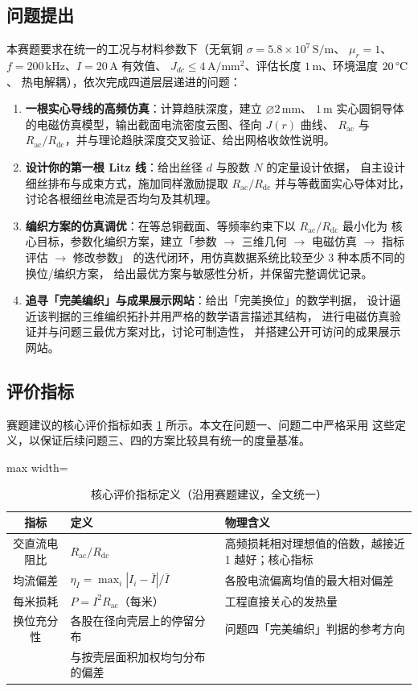 \documentclass[12pt, a4paper]{ctexart}
\newcommand{\Rac}{R_{\mathrm{ac}}}
\newcommand{\Rdc}{R_{\mathrm{dc}}}
\newcommand{\U}[1]{\ensuremath{\,\mathrm{#1}}}
\newcommand{\UdegC}{\ensuremath{\,\text{\textdegree}\mathrm{C}}}%
\begin{document}
\subsection{问题提出}

本赛题要求在统一的工况与材料参数下（无氧铜 $\sigma = 5.8\times10^{7}\U{S/m}$、
$\mu_r = 1$、$f = 200\U{kHz}$、$I = 20\U{A}$ 有效值、
$J_{dc}\le 4\U{A/mm^2}$、评估长度 $1\U{m}$、环境温度 $20\UdegC$、
热电解耦），依次完成四道层层递进的问题：

\begin{enumerate}[label=\textbf{问题\arabic*}, leftmargin=4.2em, itemsep=3pt]
\item \textbf{一根实心导线的高频仿真}：计算趋肤深度，建立 $\varnothing 2\U{mm}$、
$1\U{m}$ 实心圆铜导体的电磁仿真模型，输出截面电流密度云图、径向 $J(r)$ 曲线、
$\Rac$ 与 $\Rac/\Rdc$，并与理论趋肤深度交叉验证、给出网格收敛性说明。
\item \textbf{设计你的第一根 Litz 线}：给出丝径 $d$ 与股数 $N$ 的定量设计依据，
自主设计细丝排布与成束方式，施加同样激励提取 $\Rac/\Rdc$ 并与等截面实心导体对比，
讨论各根细丝电流是否均匀及其机理。
\item \textbf{编织方案的仿真调优}：在等总铜截面、等频率约束下以 $\Rac/\Rdc$ 最小化为
核心目标，参数化编织方案，建立「参数 $\to$ 三维几何 $\to$ 电磁仿真 $\to$ 指标评估 $\to$ 修改参数」
的迭代闭环，用仿真数据系统比较至少 3 种本质不同的换位/编织方案，
给出最优方案与敏感性分析，并保留完整调优记录。
\item \textbf{追寻「完美编织」与成果展示网站}：给出「完美换位」的数学判据，
设计逼近该判据的三维编织拓扑并用严格的数学语言描述其结构，
进行电磁仿真验证并与问题三最优方案对比，讨论可制造性，
并搭建公开可访问的成果展示网站。
\end{enumerate}

\subsection{评价指标}

赛题建议的核心评价指标如表 \ref{tab:metrics} 所示。本文在问题一、问题二中严格采用
这些定义，以保证后续问题三、四的方案比较具有统一的度量基准。

\begin{table}[H]
\centering
\caption{核心评价指标定义（沿用赛题建议，全文统一）}
\label{tab:metrics}
\small
\begin{adjustbox}{max width=\textwidth}
\begin{tabular}{c l l}
\toprule
\textbf{指标} & \textbf{定义} & \textbf{物理含义} \\
\midrule
交直流电阻比 & $\Rac/\Rdc$ & 高频损耗相对理想值的倍数，越接近 1 越好；核心指标 \\
均流偏差 & $\eta_I = \max_i |I_i - \bar I| / \bar I$ & 各股电流偏离均值的最大相对偏差 \\
每米损耗 & $P = I^2 \Rac$（每米） & 工程直接关心的发热量 \\
换位充分性 & 各股在径向壳层上的停留分布 & 问题四「完美编织」判据的参考方向 \\
 & 与按壳层面积加权均匀分布的偏差 & \\
\bottomrule
\end{tabular}
\end{adjustbox}
\end{table}
\end{document}
